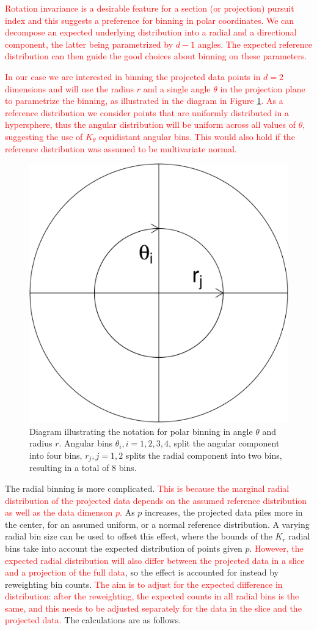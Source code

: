 \documentclass[]{interact}
\theoremstyle{plain}%
\theoremstyle{definition}
\theoremstyle{remark}
\begin{document}
\textcolor{red}{Rotation invariance is a desirable feature for a section (or projection) pursuit index and this suggests a preference for binning in polar coordinates. We can decompose an expected underlying distribution into a radial and a directional component, the latter being parametrized by $d-1$ angles. The expected reference distribution can then guide the good choices about binning on these parameters.}

\textcolor{red}{In our case we are interested in binning the projected data points in $d=2$ dimensions and will use the radius $r$ and a single angle $\theta$ in the projection plane to parametrize the binning, as illustrated in the diagram in Figure \ref{fig:sketch}. As a reference distribution we consider points that are uniformly distributed in a hypersphere, thus the angular distribution will be uniform across all values of $\theta$, suggesting the use of $K_{\theta}$ equidistant angular bins. This would also hold if the reference distribution was assumed to be multivariate normal.}

\begin{figure}

{\centering \includegraphics[width=0.3\linewidth]{section_pursuit_files/figure-latex/sketch-1} 

}

\caption{Diagram illustrating the notation for polar binning in angle $\theta$ and radius $r$. Angular bins $\theta_i, i=1, 2, 3, 4$, split the angular component into four bins, $r_j, j=1, 2$ splits the radial component into two bins, resulting in a total of 8 bins.}\label{fig:sketch}
\end{figure}

The radial binning is more complicated.
\textcolor{red}{This is because the marginal radial distribution of the projected data depends on the assumed reference distribution as well as the data dimenson $p$.}
As \(p\) increases, the projected data piles more in the center, for an
assumed uniform, or a normal reference distribution. A varying radial
bin size can be used to offset this effect, where the bounds of the
\(K_r\) radial bins take into account the expected distribution of
points given \(p\).
\textcolor{red}{However, the expected radial distribution will also differ between the projected data in a slice and a projection of the full data},
so the effect is accounted for instead by reweighting bin counts.
\textcolor{red}{The aim is to adjust for the expected difference in distribution: after the reweighting, the expected counts in all radial bins is the same, and this needs to be adjusted separately for the data in the slice and the projected data.}
The calculations are as follows.
\end{document}
